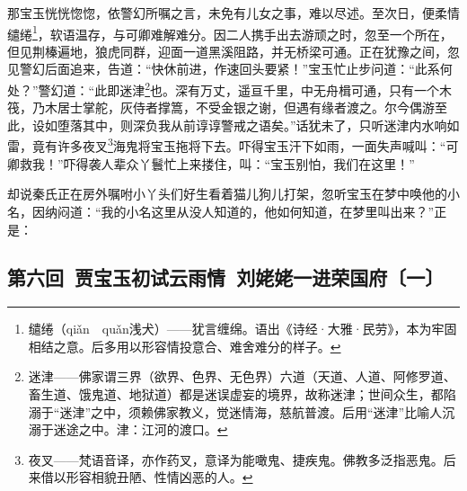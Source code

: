 \par 那宝玉恍恍惚惚，依警幻所嘱之言，未免有儿女之事，难以尽述。至次日，便柔情缱绻\footnote{缱绻（qiǎn　quǎn浅犬）——犹言缠绵。语出《诗经·大雅·民劳》，本为牢固相结之意。后多用以形容情投意合、难舍难分的样子。}，软语温存，与可卿难解难分。因二人携手出去游顽之时，忽至一个所在，但见荆榛遍地，狼虎同群，迎面一道黑溪阻路，并无桥梁可通。正在犹豫之间，忽见警幻后面追来，告道：“快休前进，作速回头要紧！”宝玉忙止步问道：“此系何处？”警幻道：“此即迷津\footnote{迷津——佛家谓三界（欲界、色界、无色界）六道（天道、人道、阿修罗道、畜生道、饿鬼道、地狱道）都是迷误虚妄的境界，故称迷津；世间众生，都陷溺于“迷津”之中，须赖佛家教义，觉迷情海，慈航普渡。后用“迷津”比喻人沉溺于迷途之中。津：江河的渡口。}也。深有万丈，遥亘千里，中无舟楫可通，只有一个木筏，乃木居士掌舵，灰侍者撑篙，不受金银之谢，但遇有缘者渡之。尔今偶游至此，设如堕落其中，则深负我从前谆谆警戒之语矣。”话犹未了，只听迷津内水响如雷，竟有许多夜叉\footnote{夜叉——梵语音译，亦作药叉，意译为能噉鬼、捷疾鬼。佛教多泛指恶鬼。后来借以形容相貌丑陋、性情凶恶的人。}海鬼将宝玉拖将下去。吓得宝玉汗下如雨，一面失声喊叫：“可卿救我！”吓得袭人辈众丫鬟忙上来搂住，叫：“宝玉别怕，我们在这里！”
\par 却说秦氏正在房外嘱咐小丫头们好生看着猫儿狗儿打架，忽听宝玉在梦中唤他的小名，因纳闷道：“我的小名这里从没人知道的，他如何知道，在梦里叫出来？”正是：




\subsection*{第六回\ 贾宝玉初试云雨情\ 刘姥姥一进荣国府〔一〕}















